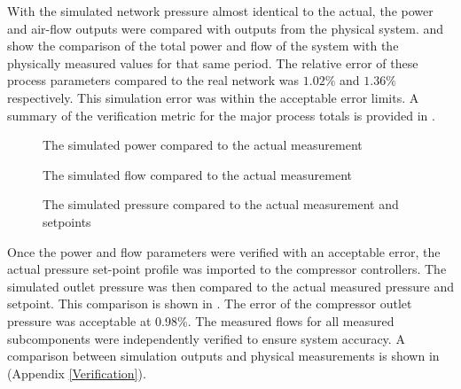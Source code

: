  With the simulated network pressure almost identical to the actual, the power and air-flow outputs were compared with outputs from the physical system.  and  show the comparison of the total power and flow of the system with the physically measured values for that same period. The relative error of these process parameters compared to the real network was $1.02 \%$ and $1.36 \%$ respectively. This simulation error was within the acceptable error limits. A summary of the  verification metric for the major process totals is provided in .
 \par
	\begin{figure}[h!]
		\centering
		
		\caption{The simulated power compared to the actual measurement}
		\label{fig: Verification Power kusasalethu}
	\end{figure}
	\begin{figure}[h!]
		\centering
		
		\caption{The simulated flow compared to the actual measurement}
		\label{fig: Verification Flow kusasalethu}
	\end{figure}
	 \begin{figure}[h!]
	 	\centering
	 	
	 	\caption{The simulated pressure compared to the actual measurement and setpoints}
	 	\label{fig: Verification Pressure kusasalethu Setpoint}
	 \end{figure}
	\clearpage
	Once the power and flow parameters were verified with an acceptable error, the actual pressure set-point profile was imported to the compressor controllers. The simulated outlet pressure was then compared to the actual measured pressure and setpoint. This comparison is shown in . The error of the compressor outlet pressure was acceptable at 0.98\%. The measured flows for all measured subcomponents were independently verified to ensure system accuracy. A comparison between simulation outputs and physical measurements is shown in  (Appendix \ref{Verification}).

